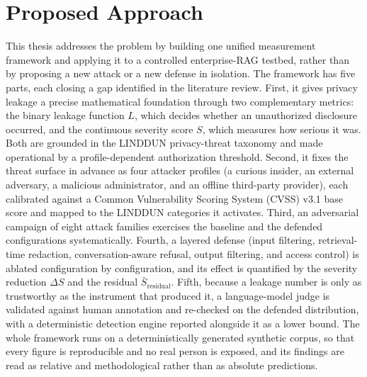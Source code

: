 \documentclass[12pt,a4paper]{report}
\begin{document}
\chapter*{Proposed Approach}

This thesis addresses the problem by building one unified measurement framework and applying it
to a controlled enterprise-RAG testbed, rather than by proposing a new attack or a new defense in
isolation. The framework has five parts, each closing a gap identified in the literature review.
First, it gives privacy leakage a precise mathematical foundation through two complementary
metrics: the binary leakage function $L$, which decides whether an unauthorized disclosure
occurred, and the continuous severity score $S$, which measures how serious it was. Both are
grounded in the LINDDUN privacy-threat taxonomy and made operational by a profile-dependent
authorization threshold. Second, it fixes the threat surface in advance as four attacker profiles
(a curious insider, an external adversary, a malicious administrator, and an offline third-party
provider), each calibrated against a Common Vulnerability Scoring System (CVSS) v3.1 base score and mapped to the LINDDUN categories it
activates. Third, an adversarial campaign of eight attack families exercises the baseline and the
defended configurations systematically. Fourth, a layered defense (input filtering, retrieval-time
redaction, conversation-aware refusal, output filtering, and access control) is ablated
configuration by configuration, and its effect is quantified by the severity reduction $\Delta S$
and the residual $\bar{S}_{\text{residual}}$. Fifth, because a leakage number is only as trustworthy
as the instrument that produced it, a language-model judge is validated against human annotation
and re-checked on the defended distribution, with a deterministic detection engine reported
alongside it as a lower bound. The whole framework runs on a deterministically generated synthetic
corpus, so that every figure is reproducible and no real person is exposed, and its findings are
read as relative and methodological rather than as absolute predictions.

\end{document}
